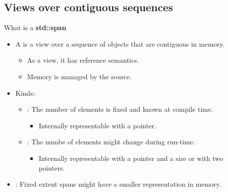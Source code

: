 \subsection{Views over contiguous sequences}

\begin{frame}[t,fragile]{What is a \textbf{std::span}}
\begin{itemize}
  \item A  is a view over a sequence of objects that
        are contiguous in memory.
    \begin{itemize}
      \item As a view, it has reference semantics.
      \item Memory is managed by the source.
    \end{itemize}

  \item Kinds:
    \begin{itemize}
      \item {}: The number of elements is fixed
            and known at compile time.
        \begin{itemize}
          \item Internally representable with a pointer.
        \end{itemize}
      \item {}: The numbe of elements 
            might change during run-time.
        \begin{itemize}
          \item Internally representable with a pointer and a size
                or with two pointers.
        \end{itemize}
    \end{itemize}

  \item {}: Fixed extent spans might have a smaller representation
        in memory.
\end{itemize}
\end{frame}

